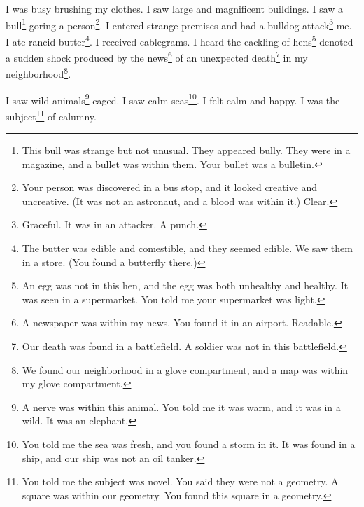 \documentclass[12pt]{book}
\begin{document}
 I was busy brushing my clothes. I saw large and magnificent buildings. I saw a bull\footnote{This bull was strange but not unusual. They appeared bully. They were in a magazine, and a bullet was within them. Your bullet was a bulletin.} goring a person\footnote{Your person was discovered in a bus stop, and it looked creative and uncreative. (It was not an astronaut, and a blood was within it.) Clear.}. I entered strange premises and had a bulldog attack\footnote{Graceful. It was in an attacker. A punch.} me. I ate rancid butter\footnote{The butter was edible and comestible, and they seemed edible. We saw them in a store. (You found a butterfly there.)}. I received cablegrams. I heard the cackling of hens\footnote{An egg was not in this hen, and the egg was both unhealthy and healthy. It was seen in a supermarket. You told me your supermarket was light.} denoted a sudden shock produced by the news\footnote{A newspaper was within my news. You found it in an airport. Readable.} of an unexpected death\footnote{Our death was found in a battlefield. A soldier was not in this battlefield.} in my neighborhood\footnote{We found our neighborhood in a glove compartment, and a map was within my glove compartment.}. 

 I saw wild animals\footnote{A nerve was within this animal. You told me it was warm, and it was in a wild. It was an elephant.} caged. I saw calm seas\footnote{You told me the sea was fresh, and you found a storm in it. It was found in a ship, and our ship was not an oil tanker.}. I felt calm and happy. I was the subject\footnote{You told me the subject was novel. You said they were not a geometry. A square was within our geometry. You found this square in a geometry.} of calumny. 
\end{document}
